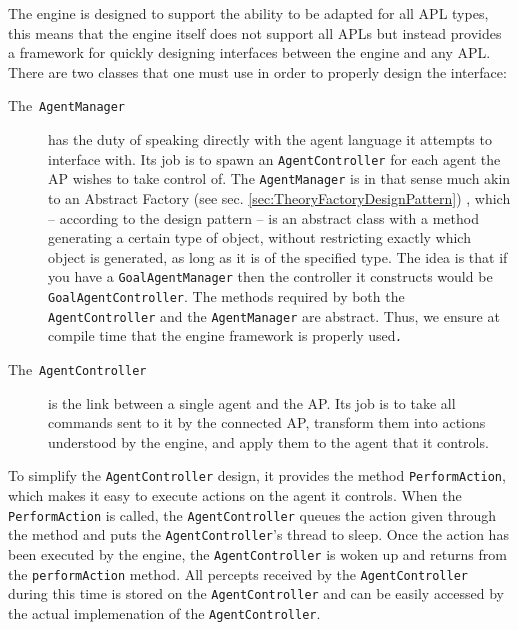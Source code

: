 The engine is designed to support the ability to be adapted for all
APL types, this means that the engine itself does not support all
APLs but instead provides a framework for quickly designing interfaces
between the engine and any APL. There are two classes that one must
use in order to properly design the interface:
\begin{description}
\item [{The~\texttt{AgentManager}}] has the duty of speaking directly
with the agent language it attempts to interface with. Its job is
to spawn an \texttt{AgentController} for each agent the AP wishes
to take control of. The \texttt{AgentManager} is in that sense much
akin to an Abstract Factory (see sec. \ref{sec:TheoryFactoryDesignPattern})
, which -- according to the design pattern -- is an abstract class
with a method generating a certain type of object, without restricting
exactly which object is generated, as long as it is of the specified
type. The idea is that if you have a \texttt{GoalAgentManager} then
the controller it constructs would be \texttt{GoalAgentController}.
The methods required by both the \texttt{AgentController} and the
\texttt{AgentManager} are abstract. Thus, we ensure at compile time
that the engine framework is properly used\texttt{\emph{.}}
\item [{The~\texttt{AgentController}}] is the link between a single agent
and the AP. Its job is to take all commands sent to it by the connected
AP, transform them into actions understood by the engine, and apply
them to the agent that it controls.
\end{description}
To simplify the \texttt{AgentController} design, it provides the method
\texttt{PerformAction}, which makes it easy to execute actions on
the agent it controls. When the \texttt{PerformAction} is called,
the \texttt{AgentController} queues the action given through the method
and puts the \texttt{AgentController}\textquoteright{}s thread to
sleep. Once the action has been executed by the engine, the \texttt{AgentController}
is woken up and returns from the \texttt{performAction} method. All
percepts received by the \texttt{AgentController} during this time
is stored on the \texttt{AgentController} and can be easily accessed
by the actual implemenation of the \texttt{AgentController}.

